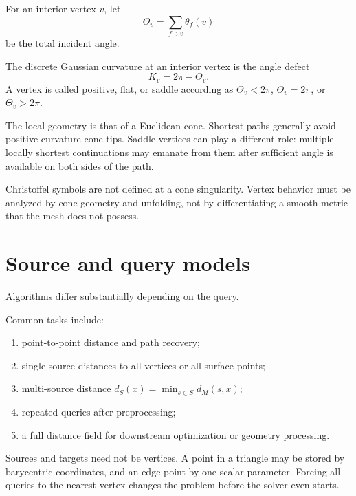 For an interior vertex \(v\), let
\[
\Theta_v=\sum_{f\ni v}\theta_f(v)
\]
be the total incident angle.

\begin{definition}\label{def:vii38-defect}
The discrete Gaussian curvature at an interior vertex is the angle defect
\[
K_v=2\pi-\Theta_v.
\]
A vertex is called positive, flat, or saddle according as
\(\Theta_v<2\pi\), \(\Theta_v=2\pi\), or \(\Theta_v>2\pi\).
\end{definition}

The local geometry is that of a Euclidean cone.  Shortest paths generally avoid
positive-curvature cone tips.  Saddle vertices can play a different role:
multiple locally shortest continuations may emanate from them after sufficient
angle is available on both sides of the path.

\begin{warning}\label{warn:vii38-vertex}
Christoffel symbols are not defined at a cone singularity.  Vertex behavior must
be analyzed by cone geometry and unfolding, not by differentiating a smooth
metric that the mesh does not possess.
\end{warning}

\section{Source and query models}

Algorithms differ substantially depending on the query.

\begin{definition}\label{def:vii38-query}
Common tasks include:
\begin{enumerate}[label=(\roman*)]
\item point-to-point distance and path recovery;
\item single-source distances to all vertices or all surface points;
\item multi-source distance \(d_S(x)=\min_{s\in S}d_M(s,x)\);
\item repeated queries after preprocessing;
\item a full distance field for downstream optimization or geometry processing.
\end{enumerate}
\end{definition}

Sources and targets need not be vertices.  A point in a triangle may be stored by
barycentric coordinates, and an edge point by one scalar parameter.  Forcing all
queries to the nearest vertex changes the problem before the solver even starts.

